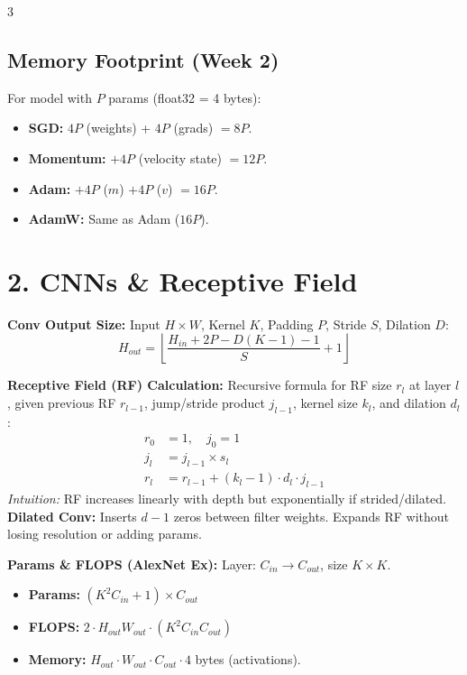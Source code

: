 \documentclass[10pt]{article}
\begin{document}
\begin{multicols*}{3}
\subsection*{Memory Footprint (Week 2)}
For model with $P$ params (float32 = 4 bytes):
\begin{itemize}
    \item \textbf{SGD:} $4P$ (weights) + $4P$ (grads) $= 8P$.
    \item \textbf{Momentum:} $+4P$ (velocity state) $= 12P$.
    \item \textbf{Adam:} $+4P$ ($m$) $+4P$ ($v$) $= 16P$.
    \item \textbf{AdamW:} Same as Adam ($16P$).
\end{itemize}

\section*{2. CNNs \& Receptive Field}

\textbf{Conv Output Size:}
Input $H \times W$, Kernel $K$, Padding $P$, Stride $S$, Dilation $D$:
$$ H_{out} = \left\lfloor \frac{H_{in} + 2P - D(K-1) - 1}{S} + 1 \right\rfloor $$

\textbf{Receptive Field (RF) Calculation:}
Recursive formula for RF size $r_l$ at layer $l$, given previous RF $r_{l-1}$, jump/stride product $j_{l-1}$, kernel size $k_l$, and dilation $d_l$:
\begin{align*}
    r_0 &= 1, \quad j_0 = 1 \\
    j_l &= j_{l-1} \times s_l \\
    r_l &= r_{l-1} + (k_l - 1) \cdot d_l \cdot j_{l-1}
\end{align*}
\textit{Intuition:} RF increases linearly with depth but exponentially if strided/dilated. 
\textbf{Dilated Conv:} Inserts $d-1$ zeros between filter weights. Expands RF without losing resolution or adding params.

\textbf{Params \& FLOPS (AlexNet Ex):}
Layer: $C_{in} \to C_{out}$, size $K \times K$.
\begin{itemize}
    \item \textbf{Params:} $(K^2 C_{in} + 1) \times C_{out}$
    \item \textbf{FLOPS:} $2 \cdot H_{out} W_{out} \cdot (K^2 C_{in} C_{out})$
    \item \textbf{Memory:} $H_{out} \cdot W_{out} \cdot C_{out} \cdot 4$ bytes (activations).
\end{itemize}


\end{multicols*}
\end{document}
